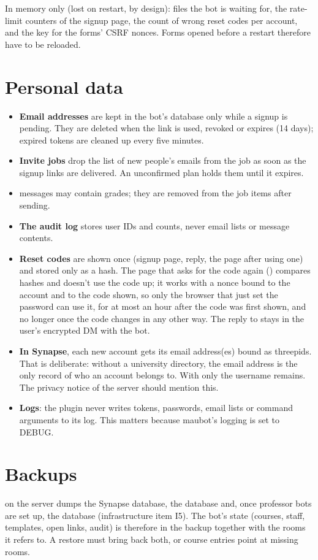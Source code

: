 In memory only (lost on restart, by design): files the bot is waiting for, the rate-limit
counters of the signup page, the count of wrong reset codes per account, and the key for the
forms' CSRF nonces. Forms opened before a restart therefore have to be reloaded.

\section{Personal data}

\begin{itemize}
  \item \textbf{Email addresses} are kept in the bot's database only while a signup is pending.
        They are deleted when the link is used, revoked or expires (14 days); expired tokens
        are cleaned up every five minutes.
  \item \textbf{Invite jobs} drop the list of new people's emails from the job as soon as the
        signup links are delivered. An unconfirmed plan holds them until it expires.
  \item \textbf{} messages may contain grades; they are removed from the job
        items after sending.
  \item \textbf{The audit log} stores user IDs and counts, never email lists or message
        contents.
  \item \textbf{Reset codes} are shown once (signup page,  reply, the
        page after using one) and stored only as a hash. The page that asks for the code
        again () compares hashes and doesn't use the code up; it works with a
        nonce bound to the account and to the code shown, so only the browser that just set
        the password can use it, for at most an hour after the code was first shown, and no
        longer once the code changes in any other way. The reply to 
        stays in the user's encrypted DM with the bot.
  \item \textbf{In Synapse}, each new account gets its email address(es) bound as threepids.
        That is deliberate: without a university directory, the email address is the only
        record of who an account belongs to. With  only
        the username remains. The privacy notice of the server should mention this.
  \item \textbf{Logs}: the plugin never writes tokens, passwords, email lists or command
        arguments to its log. This matters because maubot's logging is set to DEBUG.
\end{itemize}

\section{Backups}

 on the server dumps the Synapse database, the  database and,
once professor bots are set up, the  database (infrastructure item I5). The bot's state (courses, staff,
templates, open links, audit) is therefore in the backup together with the rooms it refers
to. A restore must bring back both, or course entries point at missing rooms.

